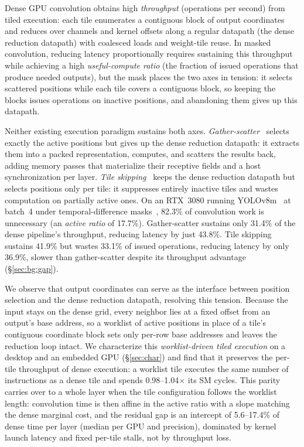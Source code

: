 Dense GPU convolution obtains high \emph{throughput} (operations per second)
from tiled execution: each tile enumerates a contiguous block of output
coordinates and reduces over channels and kernel offsets along a regular
datapath (the dense reduction datapath) with coalesced loads and
weight-tile reuse.
In masked convolution, reducing latency proportionally requires sustaining
this throughput while achieving a high \emph{useful-compute ratio} (the
fraction of issued operations that produce needed outputs), but the mask
places the two axes in tension: it selects scattered positions while each
tile covers a contiguous block, so keeping the blocks issues operations on
inactive positions, and abandoning them gives up this datapath.

Neither existing execution paradigm sustains both axes.
\emph{Gather-scatter}~\cite{sai,dgnet,dynconv} selects exactly the active
positions but gives up the dense reduction datapath: it extracts them into a
packed representation, computes, and scatters the results back, adding memory
passes that materialize their receptive fields and a host synchronization per
layer. \emph{Tile skipping}~\cite{sbnet,skipconv,evconv,deltacnn} keeps the
dense reduction datapath but selects positions only per tile: it suppresses
entirely inactive tiles and wastes computation on partially active ones.
On an RTX~3080 running YOLOv8m~\cite{yolov8} at batch~4 under temporal-difference
masks~\cite{deltacnn}, 82.3\% of convolution work is unnecessary
(an \emph{active ratio} of 17.7\%).
Gather-scatter sustains only 31.4\% of the dense pipeline's throughput,
reducing latency by just 43.8\%.
Tile skipping sustains 41.9\% but
wastes 33.1\% of issued operations, reducing latency by only 36.9\%,
slower than gather-scatter despite its throughput advantage
(\S\ref{sec:bg:gap}).

We observe that output coordinates can serve as the interface between
position selection and the dense reduction datapath, resolving this
tension. Because the input stays on the dense grid, every neighbor lies at
a fixed offset from an output's base address, so a worklist of active
positions in place of a tile's contiguous coordinate block sets only
per-row base addresses and leaves the reduction loop intact. We characterize this
\emph{worklist-driven tiled execution} on a desktop and an embedded GPU
(\S\ref{sec:char}) and find that it preserves the per-tile throughput of
dense execution: a worklist tile executes the same number of instructions as a dense
tile and spends 0.98--1.04$\times$ its SM cycles. This parity carries over
to a whole layer when the tile configuration follows the worklist length:
convolution time is then affine in the active ratio with a slope matching
the dense marginal cost, and the residual gap is an intercept of
5.6--17.4\% of dense time per layer (median per GPU and precision),
dominated by kernel launch latency and fixed per-tile stalls, not by
throughput loss.

